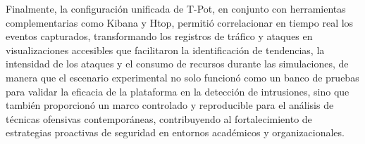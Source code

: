 Finalmente, la configuración unificada de T-Pot, en conjunto con herramientas complementarias como Kibana y Htop, permitió correlacionar en tiempo real los eventos capturados, transformando los registros de tráfico y ataques en visualizaciones accesibles que facilitaron la identificación de tendencias, la intensidad de los ataques y el consumo de recursos durante las simulaciones, de manera que el escenario experimental no solo funcionó como un banco de pruebas para validar la eficacia de la plataforma en la detección de intrusiones, sino que también proporcionó un marco controlado y reproducible para el análisis de técnicas ofensivas contemporáneas, contribuyendo al fortalecimiento de estrategias proactivas de seguridad en entornos académicos y organizacionales.